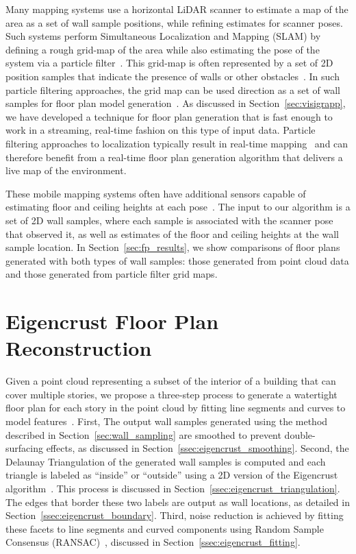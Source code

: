 \documentclass[12pt,onecolumn,oneside]{book}
\begin{document}
Many mapping systems use a horizontal LiDAR scanner to estimate a map of the area as a set of wall sample positions, while refining estimates for scanner poses.  Such systems perform Simultaneous Localization and Mapping (SLAM) by defining a rough grid-map of the area while also estimating the pose of the system via a particle filter~\cite{NickJournal,Quadrotor}.  This grid-map is often represented by a set of 2D position samples that indicate the presence of walls or other obstacles~\cite{ProbabilisticRobotics}.  In such particle filtering approaches, the grid map can be used direction as a set of wall samples for floor plan model generation~\cite{Turner14}.  As discussed in Section~\ref{sec:visigrapp}, we have developed a technique for floor plan generation that is fast enough to work in a streaming, real-time fashion on this type of input data.  Particle filtering approaches to localization typically result in real-time mapping~\cite{fastslam03,toro07} and can therefore benefit from a real-time floor plan generation algorithm that delivers a live map of the environment. 

These mobile mapping systems often have additional sensors capable of estimating floor and ceiling heights at each pose~\cite{Backpack,Quadrotor}.  The input to our algorithm is a set of 2D wall samples, where each sample is associated with the scanner pose that observed it, as well as estimates of the floor and ceiling heights at the wall sample location.  In Section~\ref{sec:fp_results}, we show comparisons of floor plans generated with both types of wall samples:  those generated from point cloud data and those generated from particle filter grid maps.

\section{Eigencrust Floor Plan Reconstruction}
\label{sec:eigencrust}

Given a point cloud representing a subset of the interior of a building that can cover multiple stories, we propose a three-step process to generate a watertight floor plan for each story in the point cloud by fitting line segments and curves to model features~\cite{Turner12}.  First, The output wall samples generated using the method described in Section~\ref{sec:wall_sampling} are smoothed to prevent double-surfacing effects, as discussed in Section~\ref{ssec:eigencrust_smoothing}.  Second, the Delaunay Triangulation of the generated wall samples is computed and each triangle is labeled as ``inside'' or ``outside'' using a 2D version of the Eigencrust algorithm~\cite{EigencrustShewchuk}.  This process is discussed in Section~\ref{ssec:eigencrust_triangulation}.  The edges that border these two labels are output as wall locations, as detailed in Section~\ref{ssec:eigencrust_boundary}.  Third, noise reduction is achieved by fitting these facets to line segments and curved components using Random Sample Consensus (RANSAC)~\cite{Ransac}, discussed in Section~\ref{ssec:eigencrust_fitting}.
\end{document}
